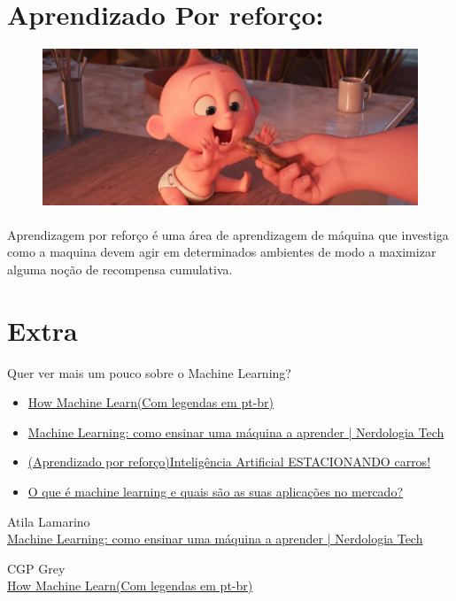 \documentclass{article}
\begin{document}
    \section{Aprendizado Por reforço:}
    \begin{figure}[ht]
        \centering
        \includegraphics[scale = 0.2]{jack-jack-num-num-cookie_orig.png}
    \end{figure}

    \paragraph{}Aprendizagem por reforço é uma área de aprendizagem de máquina que investiga como a maquina devem agir em determinados 
            ambientes de modo a maximizar alguma noção de recompensa cumulativa.

    \newpage 

    \section*{\centering Extra}
    Quer ver mais um pouco sobre o Machine Learning?
    \begin{itemize}
        \item\href{https://www.youtube.com/watch?v=R9OHn5ZF4Uo&t}{How Machine Learn(Com legendas em pt-br)}
        \item\href{https://www.youtube.com/watch?v=mhe5e2B9bL8&t}{Machine Learning: como ensinar uma máquina a aprender | Nerdologia Tech}
        \item\href{https://www.youtube.com/watch?v=r8KWciNmEGw}{(Aprendizado por reforço)Inteligência Artificial ESTACIONANDO carros!} 
        \item\href{https://blog.wittel.com/o-que-e-machine-learning/}{O que é machine learning e quais são as suas aplicações no mercado?}
    \end{itemize}

    \clearpage
    \begin{thebibliography}{2}
    
    Atila Lamarino \\
    \href{https://www.youtube.com/watch?v=mhe5e2B9bL8&t}{Machine Learning: como ensinar uma máquina a aprender | Nerdologia Tech}

    CGP Grey \\
    \href{https://www.youtube.com/watch?v=R9OHn5ZF4Uo&t}{How Machine Learn(Com legendas em pt-br)}

    \end{thebibliography}    
\end{document}
